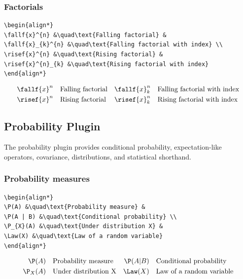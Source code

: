 \documentclass{article}
\begin{document}
\subsubsection*{Factorials}
\begin{verbatim}
\begin{align*}
\fallf{x}^{n} &\quad\text{Falling factorial} &
\fallf{x}_{k}^{n} &\quad\text{Falling factorial with index} \\
\risef{x}^{n} &\quad\text{Rising factorial} &
\risef{x}^{n}_{k} &\quad\text{Rising factorial with index}
\end{align*}
\end{verbatim}
\begin{align*}
\fallf{x}^{n} &\quad\text{Falling factorial} &
\fallf{x}_{k}^{n} &\quad\text{Falling factorial with index} \\
\risef{x}^{n} &\quad\text{Rising factorial} &
\risef{x}^{n}_{k} &\quad\text{Rising factorial with index}
\end{align*}

\subsection{Probability Plugin}

The probability plugin provides conditional probability, expectation-like operators, covariance, distributions, and statistical shorthand.

\subsubsection*{Probability measures}
\begin{verbatim}
\begin{align*}
\P(A) &\quad\text{Probability measure} &
\P(A | B) &\quad\text{Conditional probability} \\
\P_{X}(A) &\quad\text{Under distribution X} &
\Law(X) &\quad\text{Law of a random variable}
\end{align*}
\end{verbatim}
\begin{align*}
\P(A) &\quad\text{Probability measure} &
\P(A | B) &\quad\text{Conditional probability} \\
\P_{X}(A) &\quad\text{Under distribution X} &
\Law(X) &\quad\text{Law of a random variable}
\end{align*}
\end{document}
